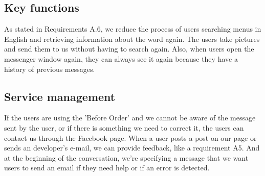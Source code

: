 \subsection{Key functions}
As stated in Requirements A.6, we reduce the process of users searching menus in English and retrieving information about the word again. The users take pictures and send them to us without having to search again. Also, when users open the messenger window again, they can always see it again because they have a history of previous messages.

\subsection{Service management}
If the users are using the 'Before Order' and we cannot be aware of the message sent by the user, or if there is something we need to correct it, the users can contact us through the Facebook page. When a user posts a post on our page or sends an developer’s e-mail, we can provide feedback, like a requirement A5. And at the beginning of the conversation, we're specifying a message that we want users to send an email if they need help or if an error is detected.











